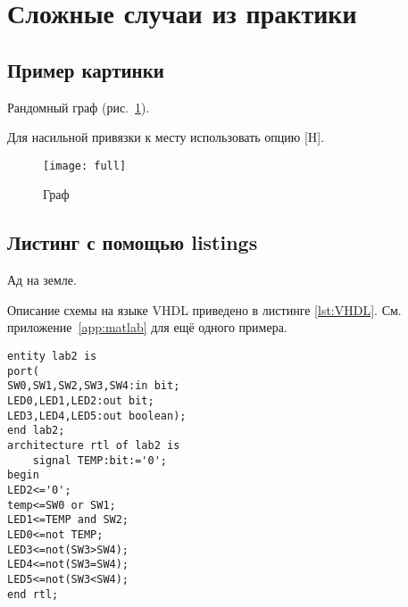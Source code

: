 \section{Сложные случаи из практики}

\subsection{Пример картинки}

Рандомный граф (рис.~\ref{pic:graph}). 

Для насильной привязки к месту использовать опцию [H].

\begin{figure}[ht]
	\centering
	\texttt{[image: full]}
	\caption{Граф}
	\label{pic:graph}
\end{figure}

\subsection{Листинг с помощью listings}

Ад на земле.


Описание схемы на языке VHDL приведено в листинге \ref{lst:VHDL}.
См. приложение~\ref{app:matlab} для ещё одного примера.

\begin{lstlisting}[label=lst:VHDL,caption=Описание схемы]
entity lab2 is
port(
SW0,SW1,SW2,SW3,SW4:in bit;
LED0,LED1,LED2:out bit;
LED3,LED4,LED5:out boolean);
end lab2;
architecture rtl of lab2 is
	signal TEMP:bit:='0';
begin
LED2<='0';
temp<=SW0 or SW1;
LED1<=TEMP and SW2;
LED0<=not TEMP;
LED3<=not(SW3>SW4);
LED4<=not(SW3=SW4);
LED5<=not(SW3<SW4);
end rtl;
\end{lstlisting}

